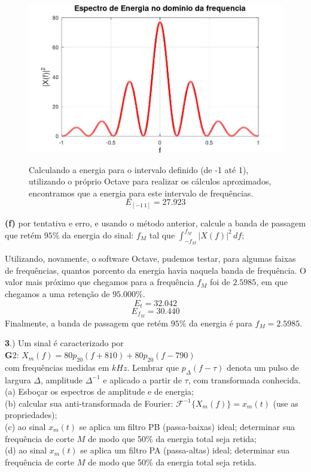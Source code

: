 \documentclass[10pt, a4paper]{article}
\begin{document}
\begin{figure}[h]
    \begin{minipage}[!]{0.50\linewidth}
        \includegraphics[scale=0.27]{plot2e.jpg}        
    \end{minipage}
    \begin{minipage}[!]{0.48\linewidth}
        Calculando a energia para o intervalo definido (de -1 até 1), utilizando o próprio Octave para realizar os cálculos aproximados, encontramos que a energia para este intervalo de frequências.
        \[E_{[-1\,1]} = 27.923\]        
    \end{minipage}
\end{figure}

\newpage

{\textbf{(f)}} por tentativa e erro, e usando o método anterior, calcule a banda de passagem que retém $95\%$ da energia do sinal: $f_{M}$ tal que $\int_{-f_{M}}^{f_{M}} |X(f)|^{2}\,df$;

Utilizando, novamente, o software Octave, pudemos testar, para algumas faixas de frequências, quantos porcento da energia havia naquela banda de frequência. O valor mais próximo que chegamos para a frequência $f_{M}$ foi de $2.5985$, em que chegamos a uma retenção de $95.000\%$.
\[E_{t} = 32.042\]
\[E_{f_{M}} = 30.440\]
Finalmente, a banda de passagem que retém $95\%$ da energia é para $f_{M} = 2.5985$.

\vspace{\baselineskip}

{\textbf 3.)} Um sinal é caracterizado por\\
{\textbf G2:} $ X_{m}(f) = 80p_{20}(f + 810) + 80p_{20}(f - 790) $\\
com frequências medidas em $kHz$. Lembrar que $p_{\Delta}(f - \tau)$ denota um pulso de largura $\Delta$, amplitude $\Delta^{-1}$ e aplicado a partir de $\tau$, com transformada conhecida.\\
(a) Esboçar os espectros de amplitude e de energia;\\
(b) calcular sua anti-transformada de Fourier: $\mathcal{F}^{-1} \{X_{m}(f)\} = x_{m}(t)$ (use as propriedades);\\
(c) ao sinal $x_{m}(t)$ se aplica um filtro PB (passa-baixas) ideal; determinar sua frequência de corte $M$ de modo que 50\% da energia total seja retida;\\
(d) ao sinal $x_{m}(t)$ se aplica um filtro PA (passa-altas) ideal; determinar sua frequência de corte $M$ de modo que 50\% da energia total seja retida.
\end{document}
